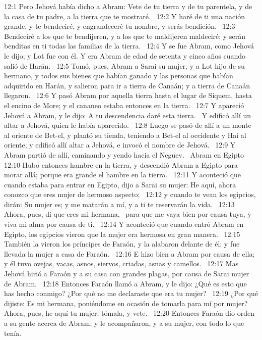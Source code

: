 12:1 Pero Jehová había dicho a Abram: Vete de tu tierra y de tu parentela, y de la casa de tu padre, a la tierra que te mostraré.  
12:2 Y haré de ti una nación grande, y te bendeciré, y engrandeceré tu nombre, y serás bendición.  
12:3 Bendeciré a los que te bendijeren, y a los que te maldijeren maldeciré; y serán benditas en ti todas las familias de la tierra.  
12:4 Y se fue Abram, como Jehová le dijo; y Lot fue con él. Y era Abram de edad de setenta y cinco años cuando salió de Harán.  
12:5 Tomó, pues, Abram a Sarai su mujer, y a Lot hijo de su hermano, y todos sus bienes que habían ganado y las personas que habían adquirido en Harán, y salieron para ir a tierra de Canaán; y a tierra de Canaán llegaron.  
12:6 Y pasó Abram por aquella tierra hasta el lugar de Siquem, hasta el encino de More; y el cananeo estaba entonces en la tierra.  
12:7 Y apareció Jehová a Abram, y le dijo: A tu descendencia daré esta tierra.  Y edificó allí un altar a Jehová, quien le había aparecido.  
12:8 Luego se pasó de allí a un monte al oriente de Bet-el, y plantó su tienda, teniendo a Bet-el al occidente y Hai al oriente; y edificó allí altar a Jehová, e invocó el nombre de Jehová.  
12:9 Y Abram partió de allí, caminando y yendo hacia el Neguev.  
Abram en Egipto  
12:10 Hubo entonces hambre en la tierra, y descendió Abram a Egipto para morar allá; porque era grande el hambre en la tierra.  
12:11 Y aconteció que cuando estaba para entrar en Egipto, dijo a Sarai su mujer: He aquí, ahora conozco que eres mujer de hermoso aspecto;  
12:12 y cuando te vean los egipcios, dirán: Su mujer es; y me matarán a mí, y a ti te reservarán la vida.  
12:13 Ahora, pues, di que eres mi hermana,  para que me vaya bien por causa tuya, y viva mi alma por causa de ti.  
12:14 Y aconteció que cuando entró Abram en Egipto, los egipcios vieron que la mujer era hermosa en gran manera.  
12:15 También la vieron los príncipes de Faraón, y la alabaron delante de él; y fue llevada la mujer a casa de Faraón.  
12:16 E hizo bien a Abram por causa de ella; y él tuvo ovejas, vacas, asnos, siervos, criadas, asnas y camellos.  
12:17 Mas Jehová hirió a Faraón y a su casa con grandes plagas, por causa de Sarai mujer de Abram.  
12:18 Entonces Faraón llamó a Abram, y le dijo: ¿Qué es esto que has hecho conmigo? ¿Por qué no me declaraste que era tu mujer?  
12:19 ¿Por qué dijiste: Es mi hermana, poniéndome en ocasión de tomarla para mí por mujer? Ahora, pues, he aquí tu mujer; tómala, y vete.  
12:20 Entonces Faraón dio orden a su gente acerca de Abram; y le acompañaron, y a su mujer, con todo lo que tenía.  
